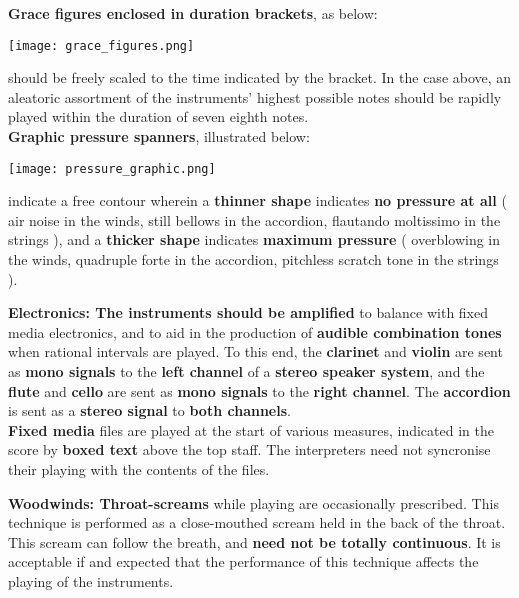 \documentclass[12pt]{article}
\newcommand*\circled[1]{\tikz[baseline=(char.base)]{
            \node[shape=circle,draw,inner sep=1pt] (char) {#1};}}
\begin{document}
\textbf{\circled{6} Grace figures enclosed in duration brackets}, as below: \\
\begin{center}
\texttt{[image: grace\_figures.png]} \\
\end{center}
should be freely scaled to the time indicated by the bracket. In the case above, an aleatoric assortment of the instruments' highest possible notes should be rapidly played within the duration of seven eighth notes. \pagebreak \\
\textbf{\circled{7} Graphic pressure spanners}, illustrated below:  
\begin{center}
\texttt{[image: pressure\_graphic.png]} \\
\end{center}
indicate a free contour wherein a \textbf{thinner shape} indicates \textbf{no pressure at all} ( air noise in the winds, still bellows in the accordion, flautando moltissimo in the strings ), and a \textbf{thicker shape} indicates \textbf{maximum pressure} ( overblowing in the winds, quadruple forte in the accordion, pitchless scratch tone in the strings ).
\endgroup 


\begingroup
\textbf{Electronics: \circled{1} The instruments should be amplified} to balance with fixed media electronics, and to aid in the production of \textbf{audible combination tones} when rational intervals are played. To this end, the \textbf{clarinet} and \textbf{violin} are sent as \textbf{mono signals} to the \textbf{left channel} of a \textbf{stereo speaker system}, and the \textbf{flute} and \textbf{cello} are sent as \textbf{mono signals} to the \textbf{right channel}. The \textbf{accordion} is sent as a \textbf{stereo signal} to \textbf{both channels}. \\
\textbf{\circled{2} Fixed media} files are played at the start of various measures, indicated in the score by \textbf{boxed text} above the top staff. The interpreters need not syncronise their playing with the contents of the files. \\
\endgroup 

\begingroup
\textbf{Woodwinds: \circled{1} Throat-screams} while playing are occasionally prescribed. This technique is performed as a close-mouthed scream held in the back of the throat. This scream can follow the breath, and \textbf{need not be totally continuous}. It is acceptable if and expected that the performance of this technique affects the playing of the instruments. 
\endgroup 
\end{document}
